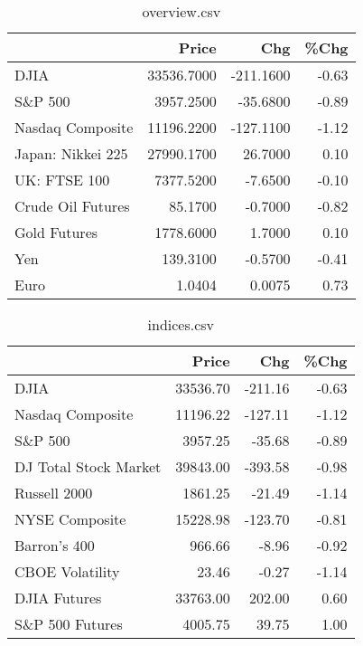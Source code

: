 \documentclass{article}%
\begin{document}
\begin{table}[htbp]%
\caption{overview.csv}%
\centering%
\begin{adjustbox}{width=1\textwidth}%
\begin{tabular}{lrrr}
\toprule
                  &      Price &       Chg &  \%Chg \\
\midrule
             DJIA & 33536.7000 & -211.1600 & -0.63 \\
          S\&P 500 &  3957.2500 &  -35.6800 & -0.89 \\
 Nasdaq Composite & 11196.2200 & -127.1100 & -1.12 \\
Japan: Nikkei 225 & 27990.1700 &   26.7000 &  0.10 \\
     UK: FTSE 100 &  7377.5200 &   -7.6500 & -0.10 \\
Crude Oil Futures &    85.1700 &   -0.7000 & -0.82 \\
     Gold Futures &  1778.6000 &    1.7000 &  0.10 \\
              Yen &   139.3100 &   -0.5700 & -0.41 \\
             Euro &     1.0404 &    0.0075 &  0.73 \\
\bottomrule
\end{tabular}
%
\end{adjustbox}%
\end{table}

%


\begin{table}[htbp]%
\caption{indices.csv}%
\centering%
\begin{adjustbox}{width=1\textwidth}%
\begin{tabular}{lrrr}
\toprule
                      &    Price &     Chg &  \%Chg \\
\midrule
                 DJIA & 33536.70 & -211.16 & -0.63 \\
     Nasdaq Composite & 11196.22 & -127.11 & -1.12 \\
              S\&P 500 &  3957.25 &  -35.68 & -0.89 \\
DJ Total Stock Market & 39843.00 & -393.58 & -0.98 \\
         Russell 2000 &  1861.25 &  -21.49 & -1.14 \\
       NYSE Composite & 15228.98 & -123.70 & -0.81 \\
         Barron's 400 &   966.66 &   -8.96 & -0.92 \\
      CBOE Volatility &    23.46 &   -0.27 & -1.14 \\
         DJIA Futures & 33763.00 &  202.00 &  0.60 \\
      S\&P 500 Futures &  4005.75 &   39.75 &  1.00 \\
\bottomrule
\end{tabular}
%
\end{adjustbox}%
\end{table}
\end{document}
